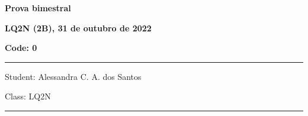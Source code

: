 \documentclass[12pt, addpoints]{exam}
\begin{document}
    \begin{minipage}[b]{0.75\linewidth}
        \begin{flushleft}
            {\bf \large Prova bimestral}
        \end{flushleft}
        \begin{flushleft}
            {\bf \large LQ2N (2B), 31 de outubro de 2022}
        \end{flushleft}
    \end{minipage}
    \begin{minipage}[b]{0.20\linewidth}
        \begin{flushright}
            {\bf \large Code: 0}
        \end{flushright}
    \end{minipage}
    \vspace{0.5cm} \hrule \vspace{0.5cm}
    \begin{minipage}{0.75\linewidth}
        \begin{flushleft}
            Student: Alessandra C. A. dos Santos
        \end{flushleft}
    \end{minipage}
    \begin{minipage}{0.20\linewidth}
        \begin{flushright}
            Class: LQ2N
        \end{flushright}
    \end{minipage}
    \vspace{0.5cm} \hrule \vspace{0.5cm}
\end{document}
